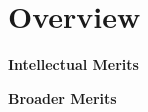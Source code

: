 \section*{Overview}
\lipsum[1-3]

\vspace{10pt}
\noindent
\textbf{Intellectual Merits} \\
\lipsum[4]
\lipsum[5]

\vspace{10pt}
\noindent
\textbf{Broader Merits} \\
\lipsum[6]
